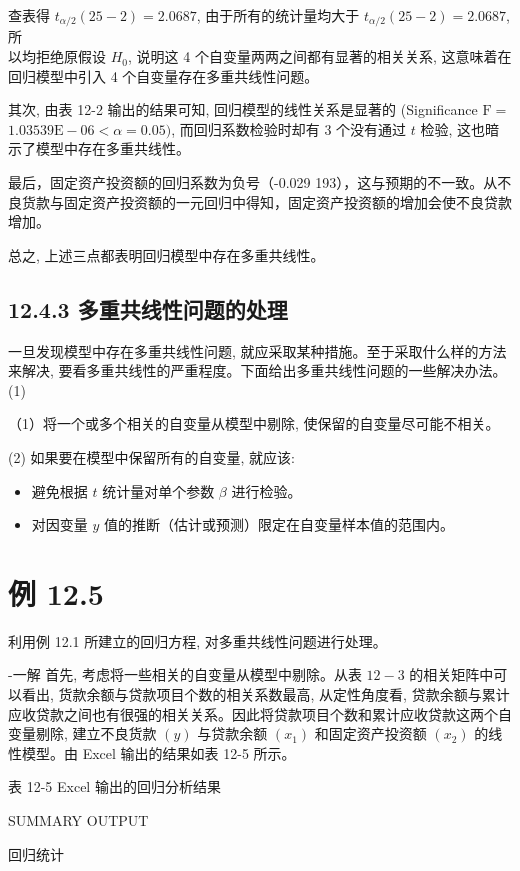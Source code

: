 \documentclass[10pt]{article}
\begin{document}
\begin{CJK*}{UTF8}{bsmi}
查表得 $t_{\alpha / 2}(25-2)=2.0687$, 由于所有的统计量均大于 $t_{\alpha / 2}(25-2)=2.0687$, 所\\
以均拒绝原假设 $H_{0}$, 说明这 4 个自变量两两之间都有显著的相关关系, 这意味着在回归模型中引入 4 个自变量存在多重共线性问题。

其次, 由表 12-2 输出的结果可知, 回归模型的线性关系是显著的 (Significance $\mathrm{F}=$ $1.03539 \mathrm{E}-06<\alpha=0.05)$, 而回归系数检验时却有 3 个没有通过 $t$ 检验, 这也暗示了模型中存在多重共线性。

最后，固定资产投资额的回归系数为负号（-0.029 193），这与预期的不一致。从不良货款与固定资产投资额的一元回归中得知，固定资产投资额的增加会使不良贷款增加。

总之, 上述三点都表明回归模型中存在多重共线性。

\subsection*{12.4.3 多重共线性问题的处理}
一旦发现模型中存在多重共线性问题, 就应采取某种措施。至于采取什么样的方法来解决, 要看多重共线性的严重程度。下面给出多重共线性问题的一些解决办法。(1)

（1）将一个或多个相关的自变量从模型中剔除, 使保留的自变量尽可能不相关。

(2) 如果要在模型中保留所有的自变量, 就应该:

\begin{itemize}
  \item 避免根据 $t$ 统计量对单个参数 $\beta$ 进行检验。
  \item 对因变量 $y$ 值的推断（估计或预测）限定在自变量样本值的范围内。
\end{itemize}

\section*{例 12.5}
利用例 12.1 所建立的回归方程, 对多重共线性问题进行处理。

-一解 首先, 考虑将一些相关的自变量从模型中剔除。从表 $12-3$ 的相关矩阵中可以看出, 货款余额与贷款项目个数的相关系数最高, 从定性角度看, 贷款余额与累计应收贷款之间也有很强的相关关系。因此将贷款项目个数和累计应收贷款这两个自变量剔除, 建立不良货款 $(y)$ 与贷款余额 $\left(x_{1}\right)$ 和固定资产投资额 $\left(x_{2}\right)$ 的线性模型。由 Excel 输出的结果如表 12-5 所示。

表 12-5 Excel 输出的回归分析结果

SUMMARY OUTPUT

回归统计


\end{CJK*}
\end{document}
